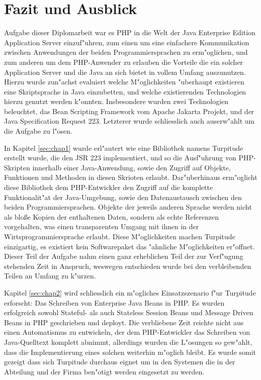 \chapter{Fazit und Ausblick}
\label{sec:extro}

Aufgabe dieser Diplomarbeit war es PHP in die Welt der Java Enterprise Edition Application Server
einzuf"uhren, zum einen um eine einfachere Kommunikation zwischen Anwendungen der beiden Programmiersprachen
zu erm"oglichen, und zum anderen um dem PHP-Anwender zu erlauben die Vorteile die ein solcher Application Server
und die Java an sich bietet in vollem Umfang auszunutzen. Hierzu wurde zun"achst evaluiert welche M"oglichkeiten
"uberhaupt existieren eine Skriptsprache in Java einzubetten, und welche existierenden Technologien hierzu
genutzt werden k"onnten. Insbesondere wurden zwei Technologien beleuchtet, das Bean Scripting Framework
vom Apache Jakarta Projekt, und der Java Specification Request 223. Letzterer wurde schliesslich auch 
auserw"ahlt um die Aufgabe zu l"osen.

In Kapitel \ref{sec:chap1} wurde erl"autert wie eine Bibliothek namens Turpitude erstellt wurde, die den JSR 223 implementiert,
und so die Ausf"uhrung von PHP-Skripten innerhalb einer Java-Anwendung, sowie den Zugriff auf Objekte, Funktionen
und Methoden in diesen Skrioten erlaubt. Dar"uberhinaus erm"oglicht diese Bibliothek dem PHP-Entwickler den
Zugriff auf die komplette Funktionalit"at der Java-Umgebung, sowie den Datenaustausch zwischen den beiden
Programmiersprachen. Objekte der jeweils anderen Sprache werden nicht als blo\ss e Kopien der enthaltenen Daten,
sondern als echte Referenzen vorgehalten, was einen transparenten Umgang mit ihnen in der Wirtsprogrammiersprache
erlaubt. Diese M"oglichkeiten machen Turpitude einzigartig, es existiert kein Softwarepaket das "ahnliche
M"oglichkeiten er"offnet. Dieser Teil der Aufgabe nahm einen ganz erheblichen Teil der zur Verf"ugung stehenden
Zeit in Anspruch, weswegen entschieden wurde bei den verbleibenden Teilen an Umfang zu k"urzen.

Kapitel \ref{sec:chap2} wird schliesslich ein m"ogliches Einsatzszenario f"ur Turpitude erforscht: Das Schreiben von
Enterprise Java Beans in PHP. Es wurden erfolgreich sowohl Stateful- als auch Stateless Session Beans und Message Driven Beans
in PHP geschrieben und deployt. Die verbliebene Zeit reichte nicht aus einen Automatismus zu entwickeln, der
dem PHP-Entwickler das Schreiben von Java-Quelltext komplett abnimmt, allerdings wurden die L"osungen so gew"ahlt, dass
die Implementierung eines solchen weiterhin m"oglich bleibt. Es wurde somit gezeigt dass sich Turpitude durchaus eignet
um in den Systemen die in der Abteilung und der Firma ben"otigt werden eingesetzt zu werden.

